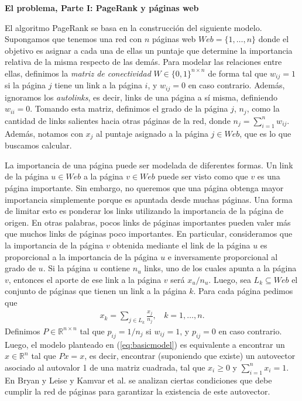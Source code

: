 \vskip 5pt
\noindent\textbf{El problema, Parte I: PageRank y p\'aginas web}
\vskip 5pt

El algoritmo PageRank se basa en la construcci\'on del siguiente modelo. Supongamos que tenemos una red con $n$ p\'aginas 
web $Web = \{1,\dots,n\}$ donde
el objetivo es asignar a cada una de ellas un puntaje que determine la importancia relativa de la misma respecto de las
dem\'as. Para modelar las relaciones entre ellas, definimos la \emph{matriz de conectividad} $W \in \{0,1\}^{n \times n}$ 
de forma tal que $w_{ij} = 1$ si la p\'agina $j$ tiene un link a la p\'agina $i$, y $w_{ij} = 0$ en caso contrario. 
Adem\'as, ignoramos los \emph{autolinks}, es decir, links de una p\'agina a s\'i misma, definiendo $w_{ii} = 0$. Tomando 
esta matriz, definimos el grado de la p\'agina $j$, $n_j$, como la cantidad de links salientes hacia otras p\'aginas 
de la red, donde $n_j = \sum_{i = 1}^n w_{ij}$. Adem\'as, notamos con $x_j$ al puntaje asignado a la p\'agina $j\in
Web$, que es lo que buscamos calcular.

La importancia de una p\'agina puede ser modelada de diferentes formas. Un link de la p\'agina $u \in
Web$ a la p\'agina $v \in Web$ puede ser visto como que $v$ es una p\'agina importante. Sin embargo, no queremos que una
p\'agina obtenga mayor importancia simplemente porque es apuntada desde muchas p\'aginas. 
Una forma de limitar esto es ponderar los links utilizando la importancia de la p\'agina de origen. En otras palabras,
pocos links de p\'aginas importantes pueden valer m\'as que muchos links de p\'aginas poco importantes. En particular,
consideramos que la importancia de la p\'agina $v$ obtenida mediante el link de la p\'agina $u$ es proporcional a la 
importancia de la p\'agina $u$ e inversamente proporcional al grado de $u$. Si la p\'agina $u$ contiene $n_u$ links,
uno de los cuales apunta a la p\'agina $v$, entonces el aporte de ese link a la p\'agina $v$ ser\'a $x_u/n_u$. Luego,
sea $L_k \subseteq Web$ el conjunto de p\'aginas que tienen un link a la p\'agina $k$. Para cada p\'agina pedimos que
\begin{eqnarray}
x_k = \sum_{j \in L_k} \frac{x_j}{n_j},~~~~k = 1,\dots,n. \label{eq:basicmodel}
\end{eqnarray}
Definimos $P \in  \mathbb{R}^{n \times n}$ tal que $p_{ij} = 1/n_j$ si $w_{ij} = 1$, y $p_{ij} = 0$ en caso contrario. Luego,
el modelo planteado en (\ref{eq:basicmodel}) es equivalente a encontrar un $x\in \mathbb{R}^n$ tal que $Px = x$, es
decir, encontrar (suponiendo que existe) un autovector asociado al autovalor 1 de una matriz cuadrada, tal que $x_i \ge
0$ y $\sum_{i = 1}^n x_i = 1$. En
Bryan y Leise \cite{Bryan2006} y Kamvar et al. \cite[Secci\'on 1]{Kamvar2003} se analizan ciertas condiciones que debe
cumplir la red de p\'aginas para garantizar la existencia de este autovector.

